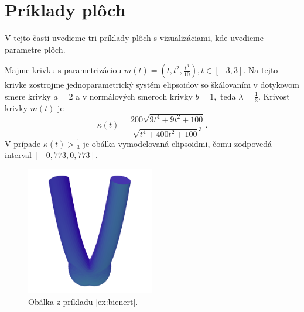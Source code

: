 \section{Príklady plôch}
V tejto časti uvedieme tri príklady plôch s vizualizáciami, kde uvedieme parametre plôch.
\begin{example}[Bienert]
\label{ex:bienert}
Majme krivku s parametrizáciou $m(t)=(t, t^2, \frac{t^3}{10}), t \in [-3,3].$  Na tejto krivke zostrojme jednoparametrický systém elipsoidov so škálovaním v dotykovom smere krivky $a = 2$ a v normálových smeroch krivky $b = 1,$ teda $\lambda = \frac{1}{3}.$
Krivosť krivky $m(t)$ je
$$
\kappa(t) = \frac{200 \sqrt{9 t^{4} + 9 t^{2} + 100}}{\sqrt{ t^{4} + 400 t^{2} + 100}^3}.
$$
V prípade $\kappa(t) > \frac{1}{3}$ je obálka vymodelovaná elipsoidmi, čomu zodpovedá interval $ [-0,773, 0,773]. $ 
\begin{figure}[h]
	\centering
	\includegraphics[width=0.5\textwidth]{images/bienert_envelope_ellipsoids.png}
	\caption[Obálka z príkladu \ref{ex:bienert}.]{Obálka z príkladu \ref{ex:bienert}.}
\end{figure}
\end{example}
